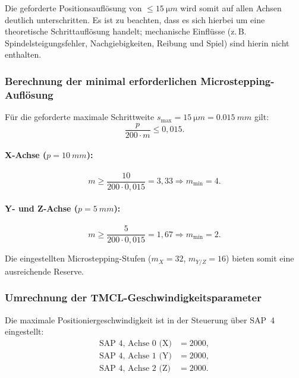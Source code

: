 Die geforderte Positionsauflösung von $\leq \SI{15}{\micro m}$ wird somit auf allen Achsen deutlich unterschritten.
Es ist zu beachten, dass es sich hierbei um eine theoretische Schrittauflösung handelt; mechanische Einflüsse
(z.\,B. Spindelsteigungsfehler, Nachgiebigkeiten, Reibung und Spiel) sind hierin nicht enthalten.

\subsubsection{Berechnung der minimal erforderlichen Microstepping-Auflösung}

Für die geforderte maximale Schrittweite $s_\text{max}=\SI{15}{\micro m}=\SI{0,015}{mm}$ gilt:
\begin{equation}
\frac{p}{200\cdot m}\leq 0,015.
\end{equation}

\paragraph{X-Achse ($p=\SI{10}{mm}$):}
\begin{equation}
m \geq \frac{10}{200\cdot 0,015} = 3,33
\Rightarrow m_\text{min}=4.
\end{equation}

\paragraph{Y- und Z-Achse ($p=\SI{5}{mm}$):}
\begin{equation}
m \geq \frac{5}{200\cdot 0,015} = 1,67
\Rightarrow m_\text{min}=2.
\end{equation}

Die eingestellten Microstepping-Stufen ($m_X=32$, $m_{Y/Z}=16$) bieten somit eine ausreichende Reserve.

\subsubsection{Umrechnung der TMCL-Geschwindigkeitsparameter}

Die maximale Positioniergeschwindigkeit ist in der Steuerung über SAP~4 eingestellt:
\begin{align}
\text{SAP 4, Achse 0 (X)} &= 2000,\\
\text{SAP 4, Achse 1 (Y)} &= 2000,\\
\text{SAP 4, Achse 2 (Z)} &= 2000.
\end{align}

